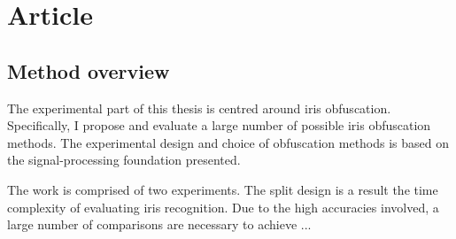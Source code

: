 \chapter{Article}

\section{Method overview}
The experimental part of this thesis is centred around iris obfuscation. Specifically, I propose and evaluate a large number of possible iris obfuscation methods. The experimental design and choice of obfuscation methods is based on the signal-processing foundation presented.

The work is comprised of two experiments. The split design is a result the time complexity of evaluating iris recognition. Due to the high accuracies involved, a large number of comparisons are necessary to achieve ...
